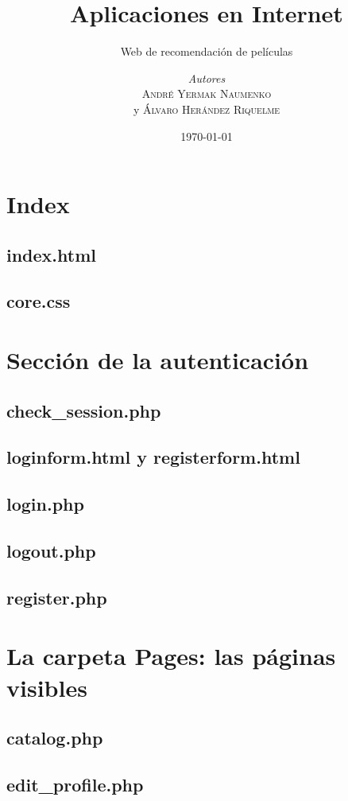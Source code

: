 \documentclass[a4paper, 12pt]{report}
\institute{Universidad Politécnica de Cartagena}
\title{Aplicaciones en Internet}
\subtitle{Web de recomendación de películas}
\author{\textit{Autores}\\\textsc{André Yermak Naumenko}\\ y \textsc{Álvaro Herández Riquelme}}
\date{\today}
\begin{document}
    \maketitle
    \romantableofcontents



    \newpage
    \newpage

    \chapter{Index}
    \section{index.html}
    \section{core.css}


    \chapter{Sección de la autenticación}
    \section{check\_session.php}
    \section{loginform.html y registerform.html}
    \section{login.php}
    \section{logout.php}
    \section{register.php}

    \chapter{La carpeta Pages: las páginas visibles}
    \section{catalog.php}
    \section{edit\_profile.php}
\end{document}
